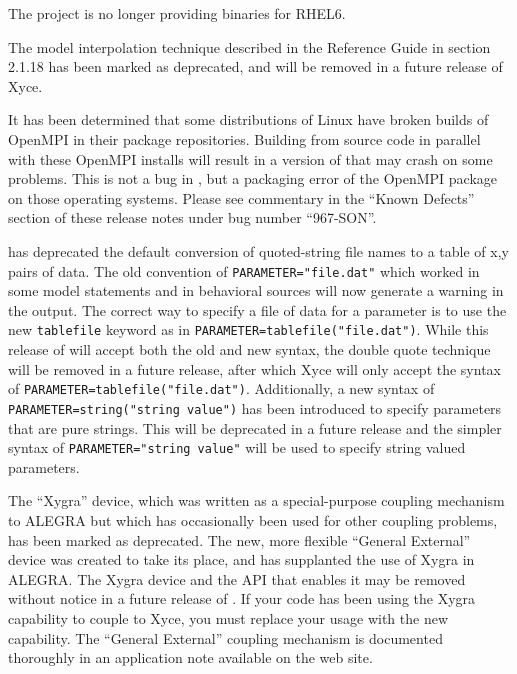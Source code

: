 \documentclass[letterpaper]{scrartcl}
\begin{document}
\begin{XyceItemize}
\item The \Xyce{} project is no longer providing binaries for RHEL6.
\item The model interpolation technique described in the \Xyce{}
  Reference Guide in section 2.1.18 has been marked as deprecated, and
  will be removed in a future release of Xyce.
\item It has been determined that some distributions of Linux have
  broken builds of OpenMPI in their package repositories.  Building
  \Xyce{} from source code in parallel with these OpenMPI installs
  will result in a version of \Xyce{} that may crash on some problems.
  This is not a bug in \Xyce{}, but a packaging error of the OpenMPI
  package on those operating systems.  Please see commentary in the
  ``Known Defects'' section of these release notes under bug number
  ``967-SON''.
\item \Xyce{} has deprecated the default conversion of quoted-string file
  names to a table of x,y pairs of data.  The old convention of
  \texttt{PARAMETER="file.dat"} which worked in some model statements
  and in behavioral sources will now generate a warning in the \Xyce{}
  output.  The correct way to specify a file of data for a parameter
  is to use the new \texttt{tablefile} keyword as in
  \texttt{PARAMETER=tablefile("file.dat")}.  While this release of
  \Xyce{} will accept both the old and new syntax, the double quote
  technique will be removed in a future release, after which Xyce
  will only accept the syntax of
  \texttt{PARAMETER=tablefile("file.dat")}.  Additionally, a new
  syntax of \texttt{PARAMETER=string("string value")} has been
  introduced to specify parameters that are pure strings.  This will
  be deprecated in a future release and the simpler syntax of
  \texttt{PARAMETER="string value"} will be used to specify string
  valued parameters.
\item The ``Xygra'' device, which was written as a special-purpose
  coupling mechanism to ALEGRA but which has occasionally been used
  for other coupling problems, has been marked as deprecated.  The
  new, more flexible ``General External'' device was created to take
  its place, and has supplanted the use of Xygra in ALEGRA.  The Xygra
  device and the API that enables it may be removed without notice in
  a future release of \Xyce{}. If your code has been using the Xygra
  capability to couple to Xyce, you must replace your usage with the
  new capability.  The ``General External'' coupling mechanism is
  documented thoroughly in an application note available on the
  \Xyce{} web site.
\end{XyceItemize}
\end{document}
